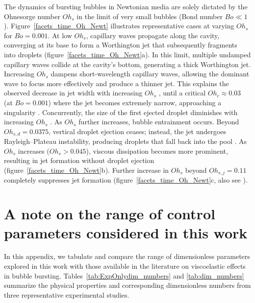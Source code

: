 \documentclass{jfm}
\begin{document}
The dynamics of bursting bubbles in Newtonian media are solely dictated by the Ohnesorge number $Oh_s$ in the limit of very small bubbles (Bond number $Bo \ll 1$).
Figure~\ref{facets_time_Oh_Newt} illustrates representative cases at varying $Oh_s$ for $Bo = 0.001$. At low $Oh_s$, capillary waves propagate along the cavity, converging at its base to form a Worthington jet that subsequently fragments into droplets (figure~\ref{facets_time_Oh_Newt}a). In this limit, multiple undamped capillary waves collide at the cavity's bottom, generating a thick Worthington jet. Increasing $Oh_s$ dampens short-wavelength capillary waves, allowing the dominant wave to focus more effectively and produce a thinner jet. This explains the observed decrease in jet width with increasing $Oh_s$ \citep{gordillo2023theory}, until a critical $Oh_c \approx 0.03$ (at $Bo=0.001$) where the jet becomes extremely narrow, approaching a singularity \citep{blanco2020sea}. Concurrently, the size of the first ejected droplet diminishes with increasing $Oh_s$ \citep{gordillo2019capillary}.
As $Oh_s$ further increases, bubble entrainment occurs. Beyond $Oh_{s, d} = 0.0375$, vertical droplet ejection ceases; instead, the jet undergoes Rayleigh--Plateau instability, producing droplets that fall back into the pool \citep{blanco2020sea, walls2015jet, deike2018dynamics}. As $Oh_s$ increases ($Oh_s > 0.045$), viscous dissipation becomes more prominent, resulting in jet formation without droplet ejection (figure~\ref{facets_time_Oh_Newt}b). Further increase in $Oh_s$ beyond $Oh_{s,j} = 0.11$ completely suppresses jet formation (figure~\ref{facets_time_Oh_Newt}c, also see \citet{sanjay-2022-JFM}).

\section{A note on the range of control parameters considered in this work}
\label{app:accounting}
\renewcommand{\thetable}{\Alph{section}\,\arabic{table}}
\setcounter{table}{0}

In this appendix, we tabulate and compare the range of dimensionless parameters explored in this work with those available in the literature on viscoelastic effects in bubble bursting. Tables~\ref{tab:ExpOnlydim_numbers} and \ref{tab:dim_numbers} summarize the physical properties and corresponding dimensionless numbers from three representative experimental studies.
\end{document}
